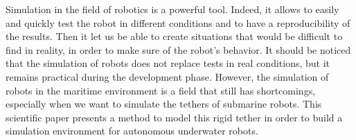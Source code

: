 Simulation in the field of robotics is a powerful tool. Indeed, it allows to easily and quickly test the robot in different conditions and to have a reproducibility of the results. Then it let us be able to create situations that would be difficult to find in reality, in order to make sure of the robot's behavior. It should be noticed that the simulation of robots does not replace tests in real conditions, but it remains practical during the development phase. However, the simulation of robots in the maritime environment is a field that still has shortcomings, especially when we want to simulate the tethers of submarine robots. This scientific paper presents a method to model this rigid tether in order to build a simulation environment for autonomous underwater robots.